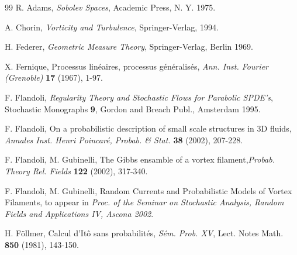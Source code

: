 \documentclass{article}
\begin{document}
\begin{thebibliography}{99}
  R. Adams, \textit{Sobolev Spaces}, Academic Press, N. Y. 1975.


  A. Chorin, \textit{Vorticity and Turbulence}, Springer-Verlag,
1994.

  H. Federer, \textit{Geometric Measure Theory},
Springer-Verlag, Berlin 1969.

 X. Fernique, Processus lin\'eaires,
    processus g\'en\'eralis\'es, \textit{Ann. Inst. Fourier
    (Grenoble)} \textbf{17} (1967), 1-97.
 
  F. Flandoli, \textit{Regularity Theory and Stochastic Flows
for Parabolic SPDE's}, Stochastic Monographs \textbf{9}, Gordon and Breach
Publ., Amsterdam 1995.

  F. Flandoli, On a probabilistic description of small scale
structures in 3D fluids, \textit{Annales Inst. Henri
Poincar\'{e}, Probab. \& Stat.} \textbf{38} (2002), 207-228.

  F. Flandoli, M. Gubinelli, The Gibbs ensamble of a vortex
filament,\textit{Probab. Theory Rel. Fields} \textbf{122} (2002), 317-340.

  F. Flandoli, M. Gubinelli, Random Currents and
  Probabilistic Models of Vortex Filaments, to appear in \textit{
  Proc. of the Seminar on Stochastic Analysis, Random Fields and
  Applications IV, Ascona 2002}.





  H. F\"{o}llmer, Calcul d'It\^{o} sans probabilit\'{e}s, 
\textit{S\'{e}m. Prob. XV}, Lect. Notes Math. \textbf{850} (1981), 143-150.


\end{thebibliography}
\end{document}
